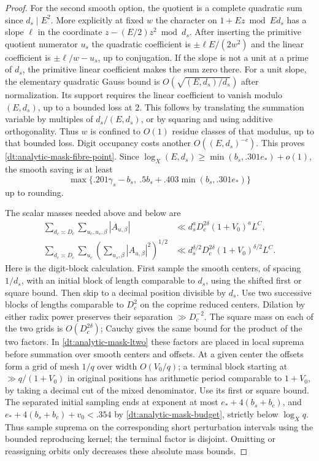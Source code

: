 \documentclass[11pt,a4paper]{article}
\theoremstyle{paperplain}
\numberwithin{equation}{section}
\begin{document}
\begin{proof}
For the second smooth option, the quotient is a complete quadratic
sum since \(d_s\mid E^2\). More explicitly at fixed \(w\) the
character on \(1+Ez\bmod Ed_s\) has a slope \(\ell\) in the
coordinate \(z-(E/2)z^2\bmod d_s\). After inserting the primitive
quotient numerator \(u_s\) the quadratic coefficient is
\(\pm\ell E/(2w^2)\) and the linear coefficient is
\(\pm\ell/w-u_s\), up to conjugation. If the slope is not a unit
at a prime of \(d_s\), the primitive linear coefficient makes the
sum zero there. For a unit slope, the elementary quadratic Gauss
bound is \(O(\sqrt{(E,d_s)/d_s})\) after normalization. Its support
requires the linear coefficient to vanish modulo \((E,d_s)\), up
to a bounded loss at 2. This follows by translating the summation
variable by multiples of \(d_s/(E,d_s)\), or by squaring and using
additive orthogonality. Thus \(w\) is confined to \(O(1)\)
residue classes of that modulus, up to that bounded loss.
Digit occupancy costs another \(O((E,d_s)^{-c})\). This proves
\eqref{dt:analytic-mask-fibre-point}. Since
\(\log_X(E,d_s)\ge\min(b_s,.301 e_*)+o(1)\), the smooth saving
is at least
\[
 \max\{.201\gamma_s-b_s,\ .5b_s+.403\min(b_s,.301 e_*)\}
\]
up to rounding.

The scalar masses needed above and below are
\begin{align}
 \sum_{d_c\asymp D_c}\sum_{u_c,u_s,\beta}|A_{u,\beta}|
        &\ll d_s^a D_c^{2\delta}(1+V_0)^a L^C, \label{dt:analytic-mask-lone}\\
 \sum_{d_c\asymp D_c}\sum_{u_c}
      \left(\sum_{u_s,\beta}|A_{u,\beta}|^2\right)^{1/2}
        &\ll d_s^{\delta/2}D_c^{2\delta}(1+V_0)^{\delta/2}L^C .
                \label{dt:analytic-mask-ltwo}
\end{align}
Here is the digit-block calculation. First sample the smooth
centers, of spacing \(1/d_s\), with an initial block of length
comparable to \(d_s\), using the shifted first or square bound.
Then skip to a decimal position divisible by \(d_s\). Use two
successive blocks of lengths comparable to \(D_c^2\) on the
coprime reduced centers. Dilation by either radix power
preserves their separation \(\gg D_c^{-2}\). The square mass on
each of the two grids is \(O(D_c^{2\delta})\); Cauchy gives the
same bound for the product of the two factors. In
\eqref{dt:analytic-mask-ltwo} these factors are placed in local
suprema before summation over smooth centers and offsets.
At a given center the offsets form a grid of mesh \(1/q\)
over width \(O(V_0/q)\); a terminal block starting at
\(\gg q/(1+V_0)\) in original positions has arithmetic period
comparable to \(1+V_0\), by taking a decimal cut of the mixed
denominator. Use its first or square bound.
The separated initial sampling ends at exponent at most
\(e_*+4(b_s+b_c)\), and
\(e_*+4(b_s+b_c)+v_0<.354\) by
\eqref{dt:analytic-mask-budget}, strictly below \(\log_X q\).
Thus sample suprema on the corresponding short perturbation
intervals using the bounded reproducing kernel; the terminal
factor is disjoint. Omitting or reassigning orbits only decreases
these absolute mass bounds.


\end{proof}
\end{document}
